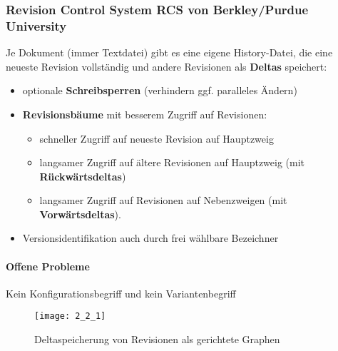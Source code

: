 \subsubsection{Revision Control System RCS von Berkley/Purdue University}Je Dokument (immer Textdatei) gibt es eine eigene History-Datei, die eine neueste Revision vollständig und andere Revisionen als \textbf{Deltas} speichert:
\begin{itemize}
	\item optionale \textbf{Schreibsperren} (verhindern ggf. paralleles Ändern)
	\item \textbf{Revisionsbäume} mit besserem Zugriff auf Revisionen:
	\begin{itemize}
		\item schneller Zugriff auf neueste Revision auf Hauptzweig
		\item langsamer Zugriff auf ältere Revisionen auf Hauptzweig  (mit \textbf{Rückwärtsdeltas})
		\item langsamer Zugriff auf Revisionen auf Nebenzweigen (mit \textbf{Vorwärtsdeltas}).
	\end{itemize}
	\item Versionsidentifikation auch durch frei wählbare Bezeichner
\end{itemize}
\paragraph{Offene Probleme}
Kein Konfigurationsbegriff und kein Variantenbegriff
\begin{figure}[h]
	\caption{Deltaspeicherung von Revisionen als gerichtete Graphen}
	\centering
	\texttt{[image: 2\_2\_1]}
\end{figure}
